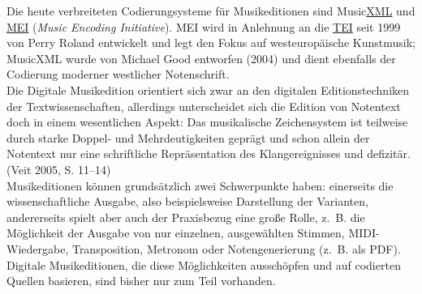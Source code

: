 \documentclass{article}
\begin{document}
        Die heute verbreiteten Codierungsysteme für Musikeditionen sind Music\href{http://gams.uni-graz.at/o:konde.215}{XML} und \href{http://gams.uni-graz.at/o:konde.226}{MEI} (\emph{Music Encoding Initiative}). MEI wird in Anlehnung an die \href{http://gams.uni-graz.at/o:konde.178}{TEI} seit 1999 von Perry Roland entwickelt und legt den Fokus auf westeuropäische Kunstmusik; MusicXML wurde von Michael Good entworfen (2004) und dient ebenfalls der Codierung moderner westlicher Notenschrift.\\
            
        Die Digitale Musikedition orientiert sich zwar an den digitalen Editionstechniken der Textwissenschaften, allerdings unterscheidet sich die Edition von Notentext doch in einem wesentlichen Aspekt: Das musikalische Zeichensystem ist teilweise durch starke Doppel- und Mehrdeutigkeiten geprägt und schon allein der Notentext nur eine schriftliche Repräsentation des Klangereignisses und defizitär. (Veit 2005, S. 11–14)\\
            
        Musikeditionen können grundsätzlich zwei Schwerpunkte haben: einerseits die wissenschaftliche Ausgabe, also beispielsweise Darstellung der Varianten, andererseits spielt aber auch der Praxisbezug eine große Rolle, z. B. die Möglichkeit der Ausgabe von nur einzelnen, ausgewählten Stimmen, MIDI-Wiedergabe, Transposition, Metronom oder Notengenerierung (z. B. als PDF). Digitale Musikeditionen, die diese Möglichkeiten ausschöpfen und auf codierten Quellen basieren, sind bisher nur zum Teil vorhanden.\\
            
\end{document}
